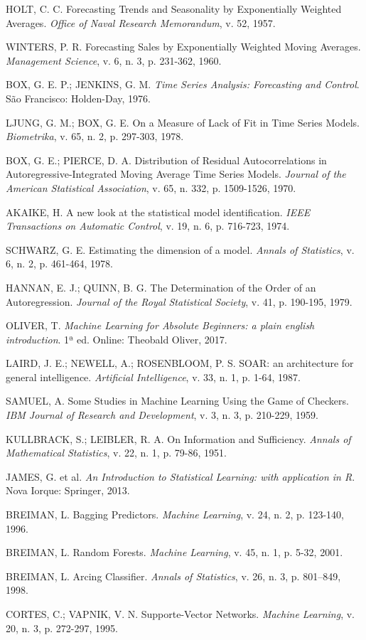 \documentclass[twocolumn]{rbef}
\newcommand{\1}{\mathbbm{1}}
\begin{document}
\begin{thebibliography}{99}
 HOLT, C. C. Forecasting Trends and Seasonality by Exponentially Weighted Averages. \textit{Office of Naval Research Memorandum}, v. 52, 1957.

 WINTERS, P. R. Forecasting Sales by Exponentially Weighted Moving Averages. \textit{Management Science}, v. 6, n. 3, p. 231-362, 1960.

 BOX, G. E. P.; JENKINS, G. M. \textit{Time Series Analysis: Forecasting and Control}. São Francisco: Holden-Day, 1976.

 LJUNG, G. M.; BOX, G. E. On a Measure of Lack of Fit in Time Series Models. \textit{Biometrika}, v. 65, n. 2, p. 297-303, 1978.

 BOX, G. E.; PIERCE, D. A. Distribution of Residual Autocorrelations in Autoregressive-Integrated Moving Average Time Series Models. \textit{Journal of the American Statistical Association}, v. 65, n. 332, p. 1509-1526, 1970.

 AKAIKE, H. A new look at the statistical model identification. \textit{IEEE Transactions on Automatic Control}, v. 19, n. 6, p. 716-723, 1974.

 SCHWARZ, G. E. Estimating the dimension of a model. \textit{Annals of Statistics}, v. 6, n. 2, p. 461-464, 1978.

 HANNAN, E. J.; QUINN, B. G. The Determination of the Order of an Autoregression. \textit{Journal of the Royal Statistical Society}, v. 41, p. 190-195, 1979.

 OLIVER, T. \textit{Machine Learning for Absolute Beginners: a plain english introduction}. 1ª ed. Online: Theobald Oliver, 2017.

 LAIRD, J. E.; NEWELL, A.; ROSENBLOOM, P. S. SOAR: an architecture for general intelligence. \textit{Artificial Intelligence}, v. 33, n. 1, p. 1-64, 1987.

 SAMUEL, A. Some Studies in Machine Learning Using the Game of Checkers. \textit{IBM Journal of Research and Development}, v. 3, n. 3, p. 210-229, 1959.

 KULLBRACK, S.; LEIBLER, R. A. On Information and Sufficiency. \textit{Annals of Mathematical Statistics}, v. 22, n. 1, p. 79-86, 1951.

 JAMES, G. et al. \textit{An Introduction to Statistical Learning: with application in R}. Nova Iorque: Springer, 2013.

 BREIMAN, L. Bagging Predictors. \textit{Machine Learning}, v. 24, n. 2, p. 123-140, 1996.

 BREIMAN, L. Random Forests. \textit{Machine Learning}, v. 45, n. 1, p. 5-32, 2001.

 BREIMAN, L. Arcing Classifier. \textit{Annals of Statistics}, v. 26, n. 3, p. 801–849, 1998.

 CORTES, C.; VAPNIK, V. N. Supporte-Vector Networks. \textit{Machine Learning}, v. 20, n. 3, p. 272-297, 1995.

\end{thebibliography}
\end{document}
